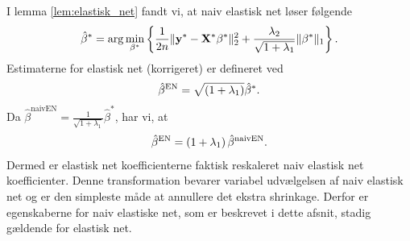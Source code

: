 I lemma \ref{lem:elastisk_net} fandt vi, at naiv elastisk net løser følgende 
\begin{align}
\hat{\beta}^* = \arg \min_{\beta^*} \cbr{\frac{1}{2n} \Vert \y^* - \X^* \beta^* \Vert_2^2 + \frac{\lambda_2}{\sqrt{1+\lambda_1}} \Vert \beta^* \Vert_1}. \label{eq:EN8}
\end{align}
Estimaterne for elastisk net (korrigeret) er defineret ved
\begin{align*}
\hat{\beta}^\text{EN} = \sqrt{\del{1+\lambda_1}} \hat{\beta}^*.
\end{align*}
Da \(\hat{\beta}^\text{naivEN} = \frac{1}{\sqrt{1+\lambda_1}} \hat{\beta}^*\), har vi, at
\begin{align*}
\hat{\beta}^\text{EN} = \del{1+\lambda_1} \hat{\beta}^\text{naivEN}.
\end{align*}
Dermed er elastisk net koefficienterne faktisk reskaleret naiv elastisk net koefficienter.
Denne transformation bevarer variabel udvælgelsen af naiv elastisk net og er den simpleste måde at annullere det ekstra shrinkage.
Derfor er egenskaberne for naiv elastiske net, som er beskrevet i dette afsnit, stadig gældende for elastisk net.

